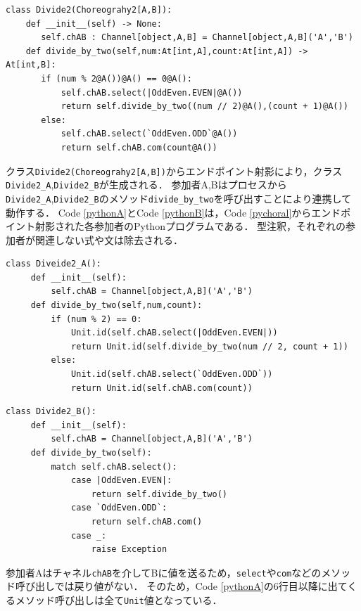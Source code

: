 \documentclass{thesis}
\begin{document}
\begin{lstlisting}[caption = 参加者\texttt{A,B}のコレオグラフィ,label=pychoral]
 class Divide2(Choreograhy2[A,B]):
    def __init__(self) -> None:
       self.chAB : Channel[object,A,B] = Channel[object,A,B]('A','B')
    def divide_by_two(self,num:At[int,A],count:At[int,A]) -> At[int,B]:
       if (num % 2@A())@A() == 0@A():
           self.chAB.select(|OddEven.EVEN|@A())
           return self.divide_by_two((num // 2)@A(),(count + 1)@A())
       else:
           self.chAB.select(`OddEven.ODD`@A())
           return self.chAB.com(count@A())
\end{lstlisting}

クラス\texttt{Divide2(Choreograhy2[A,B])}からエンドポイント射影により，クラス\texttt{Divide2\_A},\texttt{Divide2\_B}が生成される．
参加者A,Bはプロセスから\texttt{Divide2\_A},\texttt{Divide2\_B}のメソッド\texttt{divide\_by\_two}を呼び出すことにより連携して動作する．
Code \ref{pythonA}とCode \ref{pythonB}は，Code \ref{pychoral}からエンドポイント射影された各参加者のPythonプログラムである．
型注釈，それぞれの参加者が関連しない式や文は除去される．
\begin{lstlisting}[caption = 参加者AのPythonプログラム, label = pythonA]
 class Diveide2_A():
     def __init__(self):
         self.chAB = Channel[object,A,B]('A','B')
     def divide_by_two(self,num,count):
         if (num % 2) == 0:
             Unit.id(self.chAB.select(|OddEven.EVEN|))
             return Unit.id(self.divide_by_two(num // 2, count + 1))
         else:
             Unit.id(self.chAB.select(`OddEven.ODD`))
             return Unit.id(self.chAB.com(count))
 \end{lstlisting}
 
 \begin{lstlisting}[caption = 参加者BのPythonプログラム, label = pythonB]
 class Divide2_B():
     def __init__(self):
         self.chAB = Channel[object,A,B]('A','B')
     def divide_by_two(self):
         match self.chAB.select():
             case |OddEven.EVEN|:
                 return self.divide_by_two()
             case `OddEven.ODD`:
                 return self.chAB.com()
             case _:
                 raise Exception
\end{lstlisting}

参加者Aはチャネル\texttt{chAB}を介してBに値を送るため，\texttt{select}や\texttt{com}などのメソッド呼び出しでは戻り値がない．
そのため，Code \ref{pythonA}の6行目以降に出てくるメソッド呼び出しは全て\texttt{Unit}値となっている．
\end{document}
